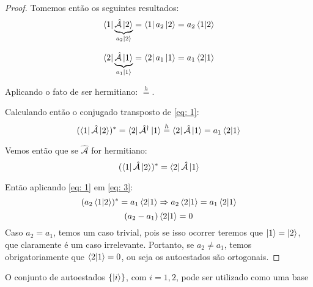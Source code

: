     \begin{proof}
        Tomemos então os seguintes resultados:
            \begin{equation}\label{eq: 1}
                \bra{1}\underbrace{\hat{\mathcal{A}}\ket{2}}_{a_{2}\ket{2}} = \bra{1}a_{2}\ket{2} = a_{2}\braket{1}{2}
            \end{equation}
            
            \begin{equation}\label{eq: 2}
                \bra{2}\underbrace{\hat{\mathcal{A}}\ket{1}}_{a_{1}\ket{1}} = \bra{2}a_{1}\ket{1} = a_{1}\braket{2}{1}
            \end{equation}
        \begin{note}{}
            Aplicando o fato de ser hermitiano: $\overset{h}{=}$.
        \end{note}
        
        Calculando então o conjugado transposto de \eqref{eq: 1}:
            \begin{equation}\label{eq: 3}
                (\bra{1}\hat{\mathcal{A}}\ket{2})^{\ast} = \bra{2}\hat{\mathcal{A}}^{\dagger}\ket{1} \overset{h}{=} \bra{2}\hat{\mathcal{A}}\ket{1} = a_{1}\braket{2}{1}
            \end{equation}
        
        Vemos então que se $\hat{\mathcal{A}}$ for hermitiano:
            \begin{equation*}
                (\bra{1}\hat{\mathcal{A}}\ket{2})^{\ast} = \bra{2}\hat{\mathcal{A}}\ket{1}
            \end{equation*}
        
        Então aplicando \eqref{eq: 1} em \ref{eq: 3}:
            \begin{equation*}
                (a_{2}\braket{1}{2})^{\ast} = a_{1}\braket{2}{1} \Rightarrow 
                a_{2}\braket{2}{1} = a_{1}\braket{2}{1}
            \end{equation*}
            \begin{equation*}
                (a_{2} - a_{1})\braket{2}{1} = 0
            \end{equation*}
        Caso $a_{2} = a_{1}$, temos um caso trivial, pois se isso ocorrer teremos que $\ket{1} = \ket{2}$, que claramente é um caso irrelevante.
        Portanto, se $a_{2}\neq a_{1}$, temos obrigatoriamente que $\braket{2}{1} = 0$, ou seja os autoestados são ortogonais.
    \end{proof}

    \begin{corollary}\label{cor: base de autoestados}
        O conjunto de autoestados $\{\ket{i}\}$, com $i=1,2$, pode ser utilizado como uma base
    \end{corollary}
    
